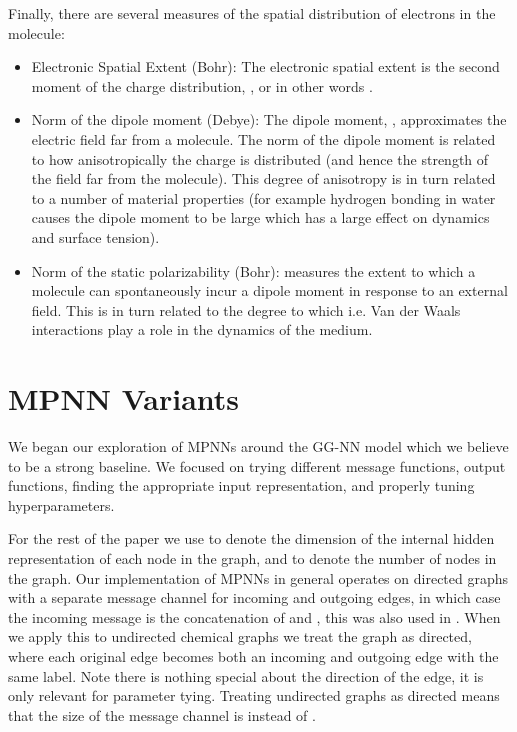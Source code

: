 \documentclass{article}
\begin{document}
Finally, there are several measures of the spatial distribution of electrons in the molecule:
\begin{itemize}
    \item Electronic Spatial Extent  (Bohr): The electronic spatial extent is the second moment of the charge distribution, , or in other words .
    \item Norm of the dipole moment  (Debye): The dipole moment, , approximates the electric field far from a molecule. The norm of the dipole moment is related to how anisotropically the charge is distributed (and hence the strength of the field far from the molecule). This degree of anisotropy is in turn related to a number of material properties (for example hydrogen bonding in water causes the dipole moment to be large which has a large effect on dynamics and surface tension).
    \item Norm of the static polarizability  (Bohr):  measures the extent to which a molecule can spontaneously incur a dipole moment in response to an external field. This is in turn related to the degree to which i.e. Van der Waals interactions play a role in the dynamics of the medium. 
\end{itemize}
\fi





\section{MPNN Variants} \label{sec:ggnn}

We began our exploration of MPNNs around the GG-NN model which we believe to be a strong baseline. We focused on trying different message functions, output functions, finding the appropriate input representation, and properly tuning hyperparameters.

For the rest of the paper we use  to denote the dimension of the internal hidden representation of each node in the graph, and  to denote the number of nodes in the graph. Our implementation of MPNNs in general operates on directed graphs with a separate message channel for incoming and outgoing edges, in which case the incoming message  is the concatenation of  and , this was also used in \citet{yujia}. When we apply this to undirected chemical graphs we treat the graph as directed, where each original edge becomes both an incoming and outgoing edge with the same label. Note there is nothing special about the direction of the edge, it is only relevant for parameter tying. Treating undirected graphs as directed means that the size of the message channel is  instead of . 
\end{document}
